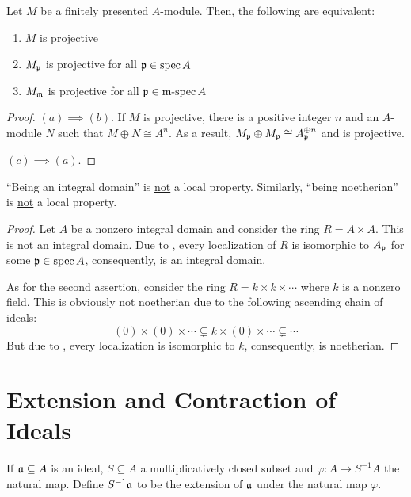 \begin{proposition}
    Let $M$ be a finitely presented $A$-module. Then, the following are equivalent: 
    \begin{enumerate}[label=(\alph*)]
        \item $M$ is projective
        \item $M_\mathfrak p$ is projective for all $\mathfrak p\in\operatorname{spec} A$ 
        \item $M_\mathfrak m$ is projective for all $\mathfrak p\in\operatorname{m-spec} A$ 
    \end{enumerate}
\end{proposition}
\begin{proof}
    $(a)\implies(b)$. If $M$ is projective, there is a positive integer $n$ and an $A$-module $N$ such that $M\oplus N\cong A^n$. As a result, $M_\mathfrak p\oplus M_\mathfrak p\cong A_\mathfrak p^{\oplus n}$ and is projective. 

    $(c)\implies(a)$. 
\end{proof}

\begin{proposition}
    ``Being an integral domain'' is \underline{not} a local property. Similarly, ``being noetherian'' is \underline{not} a local property.
\end{proposition}
\begin{proof}
    Let $A$ be a nonzero integral domain and consider the ring $R = A\times A$. This is not an integral domain. Due to , every localization of $R$ is isomorphic to $A_{\mathfrak p}$ for some $\mathfrak p\in\operatorname{spec} A$, consequently, is an integral domain. 

    As for the second assertion, consider the ring $R = k\times k\times\cdots$ where $k$ is a nonzero field. This is obviously not noetherian due to the following ascending chain of ideals: 
    \begin{equation*}
        (0)\times(0)\times\cdots\subsetneq k\times(0)\times\cdots\subsetneq\cdots
    \end{equation*}
    But due to , every localization is isomorphic to $k$, consequently, is noetherian.
\end{proof}

\section{Extension and Contraction of Ideals}

\begin{definition}
    If $\mathfrak a\subseteq A$ is an ideal, $S\subseteq A$ a multiplicatively closed subset and $\varphi: A\to S^{-1}A$ the natural map. Define $S^{-1}\mathfrak a$ to be the extension of $\mathfrak a$ under the natural map $\varphi$.
\end{definition}

